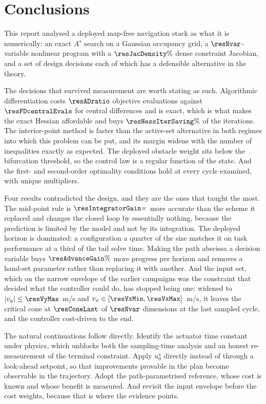 \documentclass[11pt,a4paper]{article}
\newcommand{\astar}{$A^\star$}
\begin{document}
\section{Conclusions}
\label{sec:conclusions}

This report analysed a deployed map-free navigation stack as what it is numerically: an exact \astar{} search
on a Gaussian occupancy grid, a $\resNvar$-variable nonlinear program with a $\resJacDensity\%$ dense
constraint Jacobian, and a set of design decisions each of which has a defensible alternative in the theory.

The decisions that survived measurement are worth stating as such. Algorithmic differentiation costs
$\resADratio$ objective evaluations against $\resFDcentralEvals$ for central differences and is exact, which
is what makes the exact Hessian affordable and buys $\resHessIterSaving\%$ of the iterations. The
interior-point method is faster than the active-set alternative in both regimes into which this problem can
be put, and its margin widens with the number of inequalities exactly as expected. The deployed obstacle
weight sits below the bifurcation threshold, so the control law is a regular function of the state. And the
first- and second-order optimality conditions hold at every cycle examined, with unique multipliers.

Four results contradicted the design, and they are the ones that taught the most. The mid-point rule is
$\resIntegratorGain\times$ more accurate than the scheme it replaced and changes the closed loop by
essentially nothing, because the prediction is limited by the model and not by its integration. The deployed
horizon is dominated: a configuration a quarter of the size matches it on task performance at a third of the
tail solve time. Making the path abscissa a decision variable buys $\resAdvanceGain\%$ more progress per
horizon and removes a hand-set parameter rather than replacing it with another. And the input set, which on
the narrow envelope of the earlier campaigns was the constraint that decided what the controller could do,
has stopped being one: widened to $|v_y|\le\resVyMax$~m/s and $v_x\in[\resVxMin,\resVxMax]$~m/s, it leaves
the critical cone at $\resConeLast$ of $\resNvar$ dimensions at the last sampled cycle, and the controller
cost-driven to the end.

The natural continuations follow directly. Identify the actuator time constant under physics, which unblocks
both the sampling-time analysis and an honest re-measurement of the terminal constraint. Apply $u^\star_0$
directly instead of through a look-ahead setpoint, so that improvements provable in the plan become
observable in the trajectory. Adopt the path-parametrised reference, whose cost is known and whose benefit is
measured. And revisit the input envelope before the cost weights, because that is where the evidence points.
\end{document}
